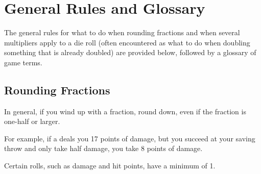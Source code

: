 \chapter{General Rules and Glossary}
\begin{cp}%
The general rules for what to do when rounding fractions and when 
several multipliers apply to a die roll (often encountered as what to 
do when doubling something that is already doubled) are provided 
below, followed by a glossary of game terms.
\end{cp}

\section{Rounding Fractions}
In general, if you wind up with a fraction, round down, even if the 
fraction is one-half or larger.
\begin{cp}%
For example, if a  deals you 17 
points of damage, but you succeed at your saving throw and only 
take half damage, you take 8 points of damage. 
\end{cp}
 Certain rolls, such as damage and hit points, have a 
minimum of 1. 
 
